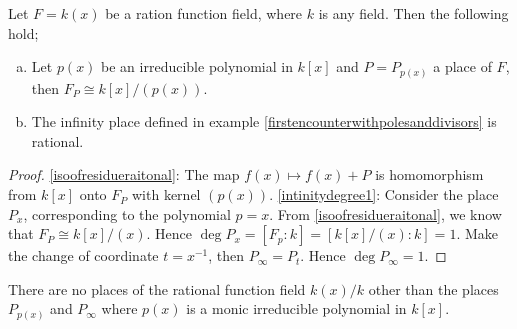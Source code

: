 
\begin{proposition} \label{propaboutrationals}
	Let $F = k(x)$ be a ration function field, where $k$ is
	any field. Then the following hold;
	\begin{enumerate}[(a)]
		\item \label{isoofresidueraitonal} 
		Let $p(x)$ be an irreducible polynomial in $k[x]$ 
		and  $P = P_{p(x)}$ a place of $F$, then $F_P \cong k[x]/(p(x))$.
		\item \label{intinitydegree1}The infinity place defined in example 
		\ref{firstencounterwithpolesanddivisors} is rational.
	\end{enumerate}
\end{proposition}

\begin{proof}
	\eqref{isoofresidueraitonal}: The map $f(x) \mapsto f(x) + P$ 
	is homomorphism from $k[x]$ onto $F_P$ with kernel $(p(x))$. 
	\eqref{intinitydegree1}: Consider the place $P_x$, corresponding
	to the polynomial $p = x$. From \eqref{isoofresidueraitonal},
	we know that $F_P \cong k[x]/(x)$. 
	Hence $\deg P_x = [F_p : k] = [k[x]/(x): k] = 1$. Make the change of 
	coordinate $t = x^{-1}$, then $P_\infty = P_t$. Hence $\deg P_\infty = 1$. 
\end{proof}


\begin{theorem} \label{noPlaceLikeHome}
	There are no places of the rational function field
	$k(x)/k$ other than the places $P_{p(x)}$ and $P_{\infty}$
	where $p(x)$ is a monic irreducible polynomial in $k[x]$. 
\end{theorem}


